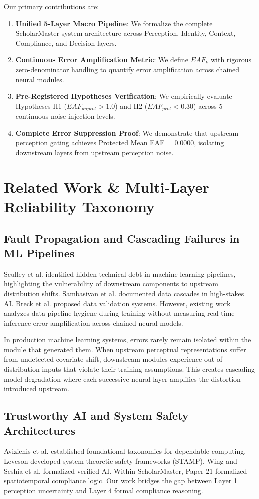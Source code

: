 \documentclass[conference]{IEEEtran}
\begin{document}
Our primary contributions are:
\begin{enumerate}
    \item \textbf{Unified 5-Layer Macro Pipeline}: We formalize the complete ScholarMaster system architecture across Perception, Identity, Context, Compliance, and Decision layers.
    \item \textbf{Continuous Error Amplification Metric}: We define $EAF_k$ with rigorous zero-denominator handling to quantify error amplification across chained neural modules.
    \item \textbf{Pre-Registered Hypotheses Verification}: We empirically evaluate Hypotheses H1 ($EAF_{unprot} > 1.0$) and H2 ($EAF_{prot} < 0.30$) across 5 continuous noise injection levels.
    \item \textbf{Complete Error Suppression Proof}: We demonstrate that upstream perception gating achieves Protected Mean EAF = 0.0000, isolating downstream layers from upstream perception noise.
\end{enumerate}

\section{Related Work & Multi-Layer Reliability Taxonomy}
\subsection{Fault Propagation and Cascading Failures in ML Pipelines}
Sculley et al. \cite{b6} identified hidden technical debt in machine learning pipelines, highlighting the vulnerability of downstream components to upstream distribution shifts. Sambasivan et al. \cite{b7} documented data cascades in high-stakes AI. Breck et al. \cite{b8} proposed data validation systems. However, existing work analyzes data pipeline hygiene during training without measuring real-time inference error amplification across chained neural models.

In production machine learning systems, errors rarely remain isolated within the module that generated them. When upstream perceptual representations suffer from undetected covariate shift, downstream modules experience out-of-distribution inputs that violate their training assumptions. This creates cascading model degradation where each successive neural layer amplifies the distortion introduced upstream.

\subsection{Trustworthy AI and System Safety Architectures}
Avizienis et al. \cite{b9} established foundational taxonomies for dependable computing. Leveson \cite{b10} developed system-theoretic safety frameworks (STAMP). Wing \cite{b11} and Seshia et al. \cite{b12} formalized verified AI. Within ScholarMaster, Paper 21 \cite{b13} formalized spatiotemporal compliance logic. Our work bridges the gap between Layer 1 perception uncertainty and Layer 4 formal compliance reasoning.
\end{document}
